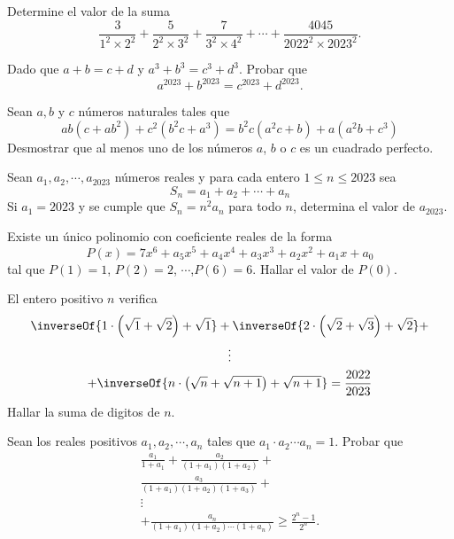 \begin{section-problem}
    Determine el valor de la suma
    \[\frac{3}{1^2\times 2^2} + \frac{5}{2^2\times 3^2} + \frac{7}{3^2\times 4^2} + \cdots + \frac{4045}{2022^2\times 2023^2}.\]
\end{section-problem}

\begin{section-problem}
    Dado que $a + b = c + d$ y $a^3 + b^3 = c^3 + d^3$.
    Probar que
    \[a^{2023} + b^{2023} = c^{2023} + d^{2023}.\]
\end{section-problem}

\begin{section-problem}
    Sean $a, b$ y $c$ números naturales tales que
    \[ab(c + ab^2) + c^2(b^{2} c + a^3) = b^2 c(a^2 c + b) + a(a^2 b + c^3)\]
    Desmostrar que al menos uno de los números $a$, $b$ o $c$ es un cuadrado perfecto.
\end{section-problem}

\begin{section-problem}
    Sean $a_1, a_2, \cdots, a_{2023}$ números reales y para cada entero $1 \leq n \leq 2023$ sea
    \[S_n = a_1 + a_2 + \cdots + a_n\]
    Si $a_1 = 2023$ y se cumple que $S_n =  n^2 a_n$ para todo $n$, determina el valor de $a_{2023}$.
\end{section-problem}

\begin{section-problem}
    Existe un único polinomio con coeficiente reales de la forma
    \[P(x) =  7x^6 + a_5 x^5 + a_4 x^4 + a_3 x^3 + a_2 x^2 + a_1 x + a_0\]
    tal que $P(1) = 1$, $P(2) = 2$, $\cdots$,$P(6) = 6$.
    Hallar el valor de $P(0)$.
\end{section-problem}

\begin{section-problem}
    El entero positivo $n$ verifica
    \begin{gather*}
        \inverseOf{1\cdot\left(\sqrt {1} + \sqrt {2}\right) + \sqrt {1}} +
        \inverseOf{2\cdot\left(\sqrt {2} + \sqrt {3}\right) + \sqrt {2}} + \\
        \vdots\\
        + \inverseOf{n\cdot\left(\sqrt {n} + \sqrt {n + 1}\right) + \sqrt {n + 1}} = \frac{2022}{2023}
    \end{gather*}
    Hallar la suma de digitos de $n$.
\end{section-problem}

\begin{section-problem}
    Sean los reales positivos $a_1, a_2, \cdots, a_n$ tales que $a_1 \cdot a_2 \cdots a_n = 1$.
    Probar que
    \begin{gather*}
        \frac{a_1}{1 + a_1} + \frac{a_2}{(1 + a_1)(1 + a_2)} + \\
        \frac{a_3}{(1 + a_1)(1 + a_2)(1 + a_3)} + \\
        \vdots\\
        + \frac{a_n}{(1 + a_1)(1 + a_2)\cdots(1 + a_n)} \geq \frac{2^n - 1}{2^n}.
    \end{gather*}
\end{section-problem}

